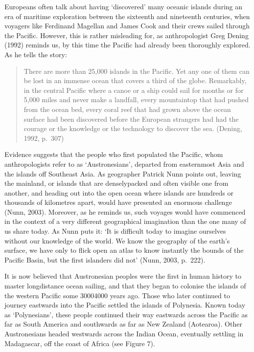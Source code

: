 \documentclass[letterpaper,10pt,english]{sphinxmanual}
\begin{document}
Europeans often talk about having ‘discovered’ many oceanic islands during an era of maritime exploration between the sixteenth and nineteenth centuries, when voyagers like Ferdinand Magellan and James Cook and their crews sailed through the Pacific. However, this is rather misleading for, as anthropologist Greg Dening (1992) reminds us, by this time the Pacific had already been thoroughly explored. As he tells the story:


\begin{quote}

There are more than 25,000 islands in the Pacific. Yet any one of them can be lost in an immense ocean that covers a third of the globe. Remarkably, in the central Pacific where a canoe or a ship could sail for months or for 5,000 miles and never make a landfall, every mountaintop that had pushed from the ocean bed, every coral reef that had grown above the ocean surface had been discovered before the European strangers had had the courage or the knowledge or the technology to discover the
sea. (Dening, 1992, p. 307)
\end{quote}

Evidence suggests that the people who first populated the Pacific, whom anthropologists refer to as ‘Austronesians’, departed from eastern\sphinxhyphen{}most Asia and the islands off Southeast Asia. As geographer Patrick Nunn points out, leaving the mainland, or islands that are densely\sphinxhyphen{}packed and often visible one from another, and heading out into the open ocean where islands are hundreds or thousands of kilometres apart, would have presented an enormous challenge (Nunn, 2003). Moreover, as he reminds us,
such voyages would have commenced in the context of a very different geographical imagination than the one many of us share today. As Nunn puts it: ‘It is difficult today to imagine ourselves without our knowledge of the world. We know the geography of the earth’s surface, we have only to flick open an atlas to know instantly the bounds of the Pacific Basin, but the first islanders did not’ (Nunn, 2003, p. 222).

It is now believed that Austronesian peoples were the first in human history to master long\sphinxhyphen{}distance ocean sailing, and that they began to colonise the islands of the western Pacific some 3000\textendash{}4000 years ago. Those who later continued to journey eastwards into the Pacific settled the islands of Polynesia. Known today as ‘Polynesians’, these people continued their way eastwards across the Pacific as far as South America and southwards as far as New Zealand (Aotearoa). Other Austronesians headed
westwards across the Indian Ocean, eventually settling in Madagascar, off the coast of Africa (see Figure 7).
\end{document}
